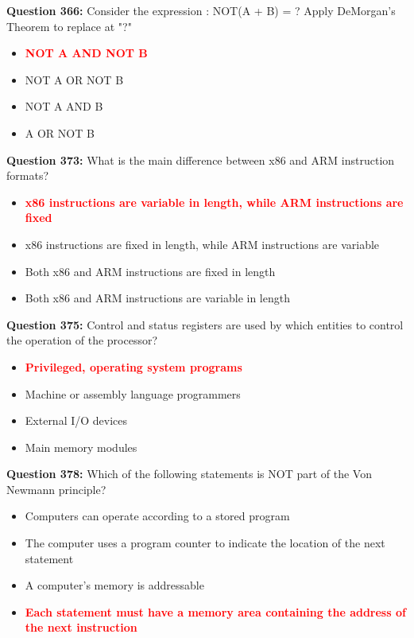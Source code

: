 \documentclass[12pt,a4paper]{article}
\begin{document}
\textbf{Question 366:} Consider the expression : NOT(A + B) = ? Apply DeMorgan's Theorem to replace at "?"

\begin{itemize}
    \item[\textbf{A.}] \textcolor{red}{\textbf{NOT A AND NOT B}}
    \item[\textbf{B.}] NOT A OR NOT B
    \item[\textbf{C.}] NOT A AND B
    \item[\textbf{D.}] A OR NOT B
\end{itemize}

\vspace{0.5cm}

\textbf{Question 373:} What is the main difference between x86 and ARM instruction formats?

\begin{itemize}
    \item[\textbf{A.}] \textcolor{red}{\textbf{x86 instructions are variable in length, while ARM instructions are fixed}}
    \item[\textbf{B.}] x86 instructions are fixed in length, while ARM instructions are variable
    \item[\textbf{C.}] Both x86 and ARM instructions are fixed in length
    \item[\textbf{D.}] Both x86 and ARM instructions are variable in length
\end{itemize}

\vspace{0.5cm}

\textbf{Question 375:} Control and status registers are used by which entities to control the operation of the processor?

\begin{itemize}
    \item[\textbf{A.}] \textcolor{red}{\textbf{Privileged, operating system programs}}
    \item[\textbf{B.}] Machine or assembly language programmers
    \item[\textbf{C.}] External I/O devices
    \item[\textbf{D.}] Main memory modules
\end{itemize}

\vspace{0.5cm}

\textbf{Question 378:} Which of the following statements is NOT part of the Von Newmann principle?

\begin{itemize}
    \item[\textbf{A.}] Computers can operate according to a stored program
    \item[\textbf{B.}] The computer uses a program counter to indicate the location of the next statement
    \item[\textbf{C.}] A computer's memory is addressable
    \item[\textbf{D.}] \textcolor{red}{\textbf{Each statement must have a memory area containing the address of the next instruction}}
\end{itemize}
\end{document}
